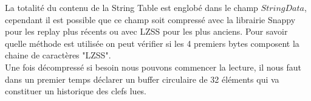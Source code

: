 \documentclass{article}
\begin{document}
La totalité du contenu de la String Table est englobé dans le champ $StringData$, cependant il est possible que ce champ soit compressé avec la librairie Snappy pour les replay plus récents ou avec LZSS pour les plus anciens. Pour savoir quelle méthode est utilisée on peut vérifier si les 4 premiers bytes composent la chaine de caractères "LZSS".\\
Une fois décompressé si besoin nous pouvons commencer la lecture, il nous faut dans un premier temps déclarer un buffer circulaire de 32 éléments qui va constituer un historique des clefs lues.\\

\newpage
\end{document}
